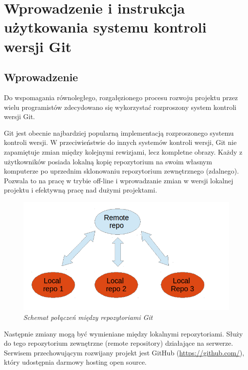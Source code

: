 \chapter{Wprowadzenie i instrukcja użytkowania systemu kontroli wersji Git}
\label{ap:1}

\section{Wprowadzenie}

Do wspomagania równoległego, rozgałęzionego procesu rozwoju projektu przez wielu programistów zdecydowano się wykorzystać rozproszony system kontroli wersji Git. 

	Git jest obecnie najbardziej popularną implementacją rozproszonego systemu kontroli wersji. W przeciwieństwie do innych systemów kontroli wersji, Git nie zapamiętuje zmian między kolejnymi rewizjami, lecz kompletne obrazy. Każdy z użytkowników posiada lokalną kopię repozytorium na swoim własnym komputerze po uprzednim sklonowaniu repozytorium zewnętrznego (zdalnego).  Pozwala to na pracę w trybie off-line i wprowadzanie zmian w wersji lokalnej projektu i efektywną pracę nad dużymi projektami.
	
\begin{figure}[!h]
    \begin{center}
    \includegraphics[angle=0,scale=0.5]{img/repo.png}
    \end{center}
    \caption{\em Schemat połączeń między repozytoriami Git}
    \label{fig:repo}
\end{figure}

Następnie zmiany mogą być wymieniane między lokalnymi repozytoriami. Służy do tego repozytorium zewnętrzne (remote repository) działające na serwerze. Serwisem przechowującym rozwijany projekt jest GitHub (\url{https://github.com/}), który udostępnia darmowy hosting open source. 


